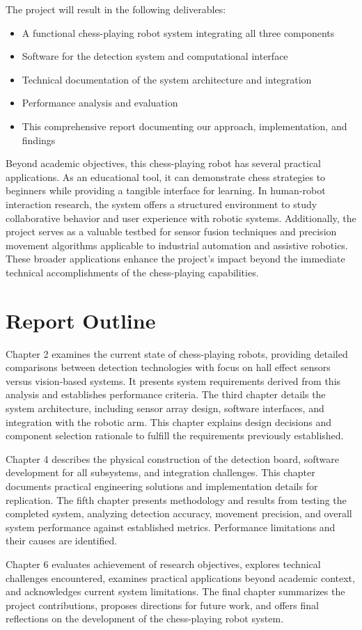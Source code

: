 The project will result in the following deliverables:
\begin{itemize}
  \item A functional chess-playing robot system integrating all three components
  \item Software for the detection system and computational interface
  \item Technical documentation of the system architecture and integration
  \item Performance analysis and evaluation
  \item This comprehensive report documenting our approach, implementation, and findings
\end{itemize}

Beyond academic objectives, this chess-playing robot has several practical applications. As an educational tool, it can demonstrate chess strategies to beginners while providing a tangible interface for learning. In human-robot interaction research, the system offers a structured environment to study collaborative behavior and user experience with robotic systems. Additionally, the project serves as a valuable testbed for sensor fusion techniques and precision movement algorithms applicable to industrial automation and assistive robotics. These broader applications enhance the project's impact beyond the immediate technical accomplishments of the chess-playing capabilities.

\section{Report Outline}

Chapter 2 examines the current state of chess-playing robots, providing detailed comparisons between detection technologies with focus on hall effect sensors versus vision-based systems. It presents system requirements derived from this analysis and establishes performance criteria. The third chapter details the system architecture, including sensor array design, software interfaces, and integration with the robotic arm. This chapter explains design decisions and component selection rationale to fulfill the requirements previously established.

Chapter 4 describes the physical construction of the detection board, software development for all subsystems, and integration challenges. This chapter documents practical engineering solutions and implementation details for replication.
The fifth chapter presents methodology and results from testing the completed system, analyzing detection accuracy, movement precision, and overall system performance against established metrics. Performance limitations and their causes are identified.

Chapter 6 evaluates achievement of research objectives, explores technical challenges encountered, examines practical applications beyond academic context, and acknowledges current system limitations.
The final chapter summarizes the project contributions, proposes directions for future work, and offers final reflections on the development of the chess-playing robot system.
